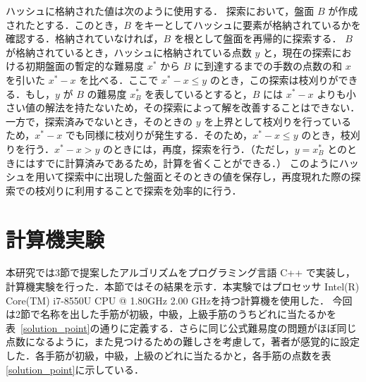 \documentclass[submit,techrep,noauthor]{ipsj}
\begin{document}
ハッシュに格納された値は次のように使用する．
探索において，盤面 $B$ が作成されたとする．このとき，$B$ をキーとしてハッシュに要素が格納されているかを確認する．格納されていなければ，$B$ を根として盤面を再帰的に探索する．
$B$ が格納されているとき，ハッシュに格納されている点数 $y$ と，現在の探索における初期盤面の暫定的な難易度 $x^*$ から $B$ に到達するまでの手数の点数の和 $x$ を引いた $x^*-x$ を比べる．ここで $x^*-x \leq y$ のとき，この探索は枝刈りができる．もし，$y$ が $B$ の難易度 $x_B^*$ を表しているとすると，$B$ には $x^*-x$ よりも小さい値の解法を持たないため，その探索によって解を改善することはできない．一方で，探索済みでないとき，そのときの $y$ を上界として枝刈りを行っているため，$x^*-x$ でも同様に枝刈りが発生する．そのため，$x^*-x \leq y$ のとき，枝刈りを行う．$x^*-x > y$ のときには，再度，探索を行う．（ただし，$y=x^*_B$ とのときにはすでに計算済みであるため，計算を省くことができる．）
このようにハッシュを用いて探索中に出現した盤面とそのときの値を保存し，再度現れた際の探索での枝刈りに利用することで探索を効率的に行う．



\section{計算機実験}
本研究では3節で提案したアルゴリズムをプログラミング言語 C++ で実装し，計算機実験を行った．本節ではその結果を示す．本実験ではプロセッサ Intel(R) Core(TM) i7-8550U CPU @ 1.80GHz 2.00 GHzを持つ計算機を使用した．
今回は2節で名称を出した手筋が初級，中級，上級手筋のうちどれに当たるかを表~\ref{solution_point}の通りに定義する．さらに同じ公式難易度の問題がほぼ同じ点数になるように，また見つけるための難しさを考慮して，著者が感覚的に設定した．各手筋が初級，中級，上級のどれに当たるかと，各手筋の点数を表\ref{solution_point}に示している．
\end{document}
